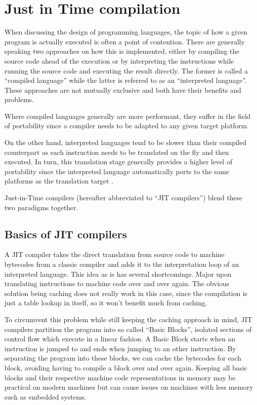 \chapter{Just in Time compilation}\label{cha:jit}

When discussing the design of programming languages, the topic of how a given program is actually executed is often a point of contention. 
There are generally speaking two approaches on how this is implemented, either by compiling the source code ahead of the execution or by interpreting the instructions while running the source code and executing the result directly. 
The former is called a \enquote{compiled language} while the latter is referred to as an \enquote{interpreted language}. 
These approaches are not mutually exclusive and both have their benefits and problems. 

Where compiled languages generally are more performant, they suffer in the field of portability since a compiler needs to be adapted to any given target platform. 

On the other hand, interpreted languages tend to be slower than their compiled counterpart as each instruction needs to be translated on the fly and then executed. In turn, this translation stage generally provides a higher level of portability since the interpreted language automatically ports to the same platforms as the translation target \cite{aycock2003}.

Just-in-Time compilers (hereafter abbreviated to \enquote{JIT compilers}) blend these two paradigms together.

\section{Basics of JIT compilers}
A JIT compiler takes the direct translation from source code to machine bytecodes from a classic compiler and adds it to the interpretation loop of an interpreted language.
This idea as is has several shortcomings. Major upon translating instructions to machine code over and over again. The obvious solution being caching does not really work in this case, since the compilation is just a table lookup in itself, so it won't benefit much from caching.

To circumvent this problem while still keeping the caching approach in mind, JIT compilers partition the program into so called \enquote{Basic Blocks}, isolated sections of control flow which execute in a linear fashion. 
A Basic Block starts when an instruction is jumped to and ends when jumping to an other instruction. 
By separating the program into these blocks, we can cache the bytecodes for each block, avoiding having to compile a block over and over again. 
Keeping all basic blocks and their respective machine code representations in memory may be practical on modern machines but can cause issues on machines with less memory such as embedded systems.

